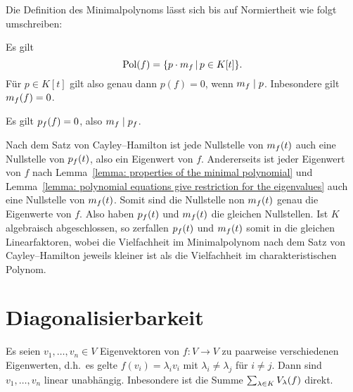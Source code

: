 Die Definition des Minimalpolynoms lässt sich bis auf Normiertheit wie folgt umschreiben:

\begin{lemma}
  \label{lemma: properties of the minimal polynomial}
  Es gilt
  \[
      \operatorname{Pol}(f)
    = \{ p \cdot m_{f} \,|\, p \in K[t] \}.
  \]
  Für $p \in K[t]$ gilt also genau dann $p(f) = 0$, wenn $m_{f} \mid p$.
  Inbesondere gilt $m_{f}(f) = 0$.
\end{lemma}

\begin{theorem}
  Es gilt $p_{f}(f) = 0$, also $m_{f} \mid p_{f}$.
\end{theorem}

Nach dem Satz von Cayley--Hamilton ist jede Nullstelle von $m_{f}(t)$ auch eine Nullstelle von $p_{f}(t)$, also ein Eigenwert von $f$.
Andererseits ist jeder Eigenwert von $f$ nach Lemma~\ref{lemma: properties of the minimal polynomial} und Lemma~\ref{lemma: polynomial equations give restriction for the eigenvalues} auch eine Nullstelle von $m_{f}(t)$.
Somit sind die Nullstelle non $m_{f}(t)$ genau die Eigenwerte von $f$.
Also haben $p_{f}(t)$ und $m_{f}(t)$ die gleichen Nullstellen.
Ist $K$ algebraisch abgeschlossen, so zerfallen $p_{f}(t)$ und $m_{f}(t)$ somit in die gleichen Linearfaktoren, wobei die Vielfachheit im Minimalpolynom nach dem Satz von Cayley--Hamilton jeweils kleiner ist als die Vielfachheit im charakteristischen Polynom.





\section{Diagonalisierbarkeit}

\begin{lemma}
  Es seien $v_1, \dotsc, v_n \in V$ Eigenvektoren von $f \colon V \to V$ zu paarweise verschiedenen Eigenwerten, d.h.\ es gelte $f(v_i) = \lambda_i v_i$ mit $\lambda_i \neq \lambda_j$ für $i \neq j$.
  Dann sind $v_1, \dotsc, v_n$ linear unabhängig.
  Inbesondere ist die Summe $\sum_{\lambda \in K} V_{\lambda}(f)$ direkt.
\end{lemma}

